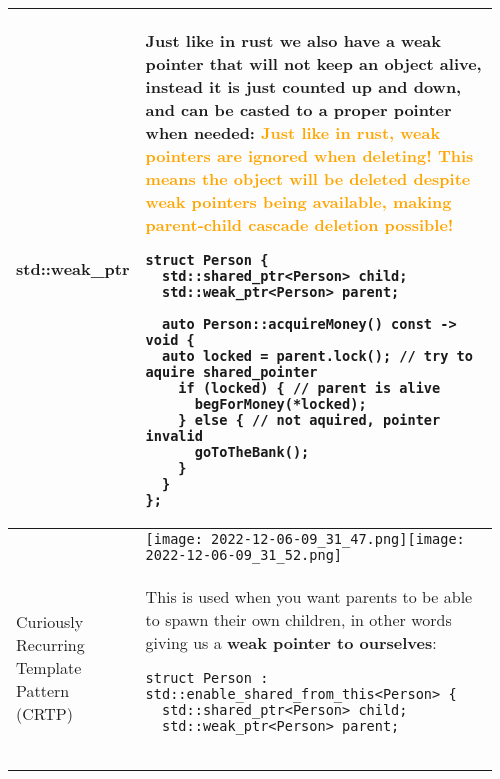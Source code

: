 \documentclass[main.tex,fontsize=8pt,paper=a4,paper=portrait,DIV=calc]{scrartcl}
\begin{document}
\pagebreak
\begin{table}[ht!]
\begin{tabular}{|m{0.2\linewidth}|m{0.755\linewidth}|}
\hline
std::weak\_ptr & 
Just like in rust we also have a weak pointer that will not keep an object alive, instead it is just counted up and down, and can be casted to a proper pointer when needed:\newline
\textcolor{orange}{Just like in rust, weak pointers are ignored when deleting! This means the object will be deleted despite weak pointers being available, making parent-child cascade deletion possible!}\newline
\begin{lstlisting}
struct Person {
  std::shared_ptr<Person> child;
  std::weak_ptr<Person> parent;

  auto Person::acquireMoney() const -> void {
  auto locked = parent.lock(); // try to aquire shared_pointer
    if (locked) { // parent is alive
      begForMoney(*locked);
    } else { // not aquired, pointer invalid
      goToTheBank();
    }
  }
};
\end{lstlisting} \\
\hline
& 
\texttt{[image: 2022-12-06-09\_31\_47.png]}\texttt{[image: 2022-12-06-09\_31\_52.png]}\\
\hline
Curiously Recurring Template Pattern (CRTP) & 
This is used when you want parents to be able to spawn their own children, in other words giving us a \textbf{weak pointer to ourselves}:\newline
\begin{lstlisting}
struct Person : std::enable_shared_from_this<Person> {
  std::shared_ptr<Person> child;
  std::weak_ptr<Person> parent;


\end{lstlisting}
\end{tabular}
\end{table}
\end{document}
